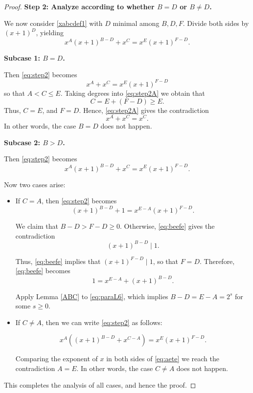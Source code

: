 \documentclass[10pt,a4paper]{amsart}
\begin{document}
\begin{proof}
\textbf{Step 2: Analyze according to whether \( B = D \) or \( B \neq D \).}

We now consider \eqref{xabcdef1}
with \( D \) minimal among \( B, D, F \). Divide both sides by \( (x+1)^D \), yielding
\begin{equation}
\label{eq:step2}
x^A(x+1)^{B - D} + x^C = x^E(x+1)^{F - D}.
\end{equation}

\textbf{Subcase 1: \( B = D \).}

Then \eqref{eq:step2} becomes
\begin{equation}
\label{eq:step2A}
x^A + x^C = x^E(x+1)^{F - D}
\end{equation}
so that $A < C \leq E$. Taking degrees into  \eqref{eq:step2A} we obtain that
\[
C = E + (F - D) \geq E.
\]
Thus, $C=E$, and $F=D$. Hence, \eqref{eq:step2A} gives the contradiction 
\[
x^A+x^C = x^C.
\]
In other words, the case $B=D$ does not happen.


\textbf{Subcase 2: \( B > D \).}

Then \eqref{eq:step2} becomes
\[
x^A(x+1)^{B - D} + x^C = x^{E}(x+1)^{F - D}.
\]

 Now two cases arise:

\begin{itemize}
    \item If \( C = A \), then \eqref{eq:step2} becomes
    \begin{equation}
    \label{eq:beefe}
    (x+1)^{B - D} + 1 = x^{E - A}(x+1)^{F - D}.
    \end{equation}
    
    We claim that $B - D > F -D \geq 0$. Otherwise, \eqref{eq:beefe} gives the contradiction
  \[
    (x+1)^{B - D} \mid 1.
    \]
    
    Thus, \eqref{eq:beefe} implies that $(x+1)^{F - D} \mid 1$, so that $F = D$.
    Therefore,  \eqref{eq:beefe} becomes
    \begin{equation}
    \label{eq:paraL6}
     1 = x^{E - A} + (x+1)^{B - D}.
    \end{equation}
    
     
       
   Apply Lemma \ref{ABC} to  \eqref{eq:paraL6}, which implies  \( B - D = E - A = 2^s \) for some \( s \geq 0 \).
   

   \item If \( C \neq A \), then we can write \eqref{eq:step2} as follows:
   
   \begin{equation}
    \label{eq:aete}
     x^A \left( (x+1)^{B-D} + x ^{C-A} \right) = x^{E} (x+1)^{F - D}.
    \end{equation}
    
   Comparing the exponent of $x$ in both sides of \eqref{eq:aete} we reach the contradiction $A = E$. In other words, the case $C \neq A$ does not happen.
 
\end{itemize}
This completes the analysis of all cases, and hence the proof.
\end{proof}
\end{document}
